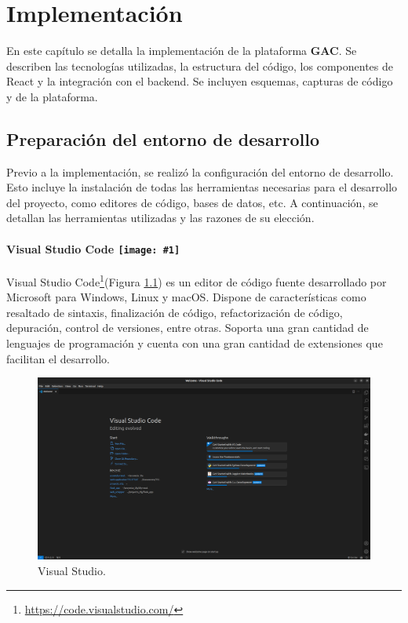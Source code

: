 \chapter{Implementación}

En este capítulo se detalla la implementación de la plataforma \textbf{GAC}. Se describen las tecnologías utilizadas, la estructura del código, los componentes de React y la integración con el backend. Se incluyen esquemas, capturas de código y de la plataforma.

\section{Preparación del entorno de desarrollo}

Previo a la implementación, se realizó la configuración del entorno de desarrollo. Esto incluye la instalación de todas las herramientas necesarias para el desarrollo del proyecto, como editores de código, bases de datos, etc. A continuación, se detallan las herramientas utilizadas y las razones de su elección.

\renewcommand{\icon}[1]{\texttt{[image: \#1]}}

\subsubsection*{Visual Studio Code \protect\icon{./imagenes/vscode_logo.png}}

Visual Studio Code\footnote{\url{https://code.visualstudio.com/}}(Figura \ref{fig:vscode}) es un editor de código fuente desarrollado por Microsoft para Windows, Linux y macOS. Dispone de características como resaltado de sintaxis, finalización de código, refactorización de código, depuración, control de versiones, entre otras. Soporta una gran cantidad de lenguajes de programación y cuenta con una gran cantidad de extensiones que facilitan el desarrollo. \newline

\begin{figure}[H]
    \centering
    \includegraphics[width=1\textwidth]{./imagenes/vscode.png}
    \caption{Visual Studio.}
    \label{fig:vscode}
\end{figure}


